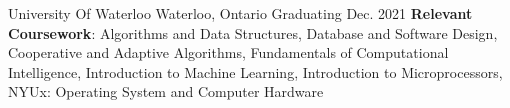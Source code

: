 \begin{siderulesEdu}
\begin{eduentries}
  \eduentry
    {\emph{\color{black}{Candidate of B.ASc: Honours Mechanical Engineering - Artificial Intelligence Option} }}
    {University Of Waterloo}
    {Waterloo, Ontario}
    {Graduating Dec. 2021}
    {\textbf{Relevant Coursework}:
    Algorithms and Data Structures, Database and Software Design, Cooperative and Adaptive Algorithms, Fundamentals of Computational Intelligence, Introduction to Machine Learning, Introduction to Microprocessors, \newline NYUx: Operating System and Computer Hardware}
\end{eduentries}
\end{siderulesEdu}
